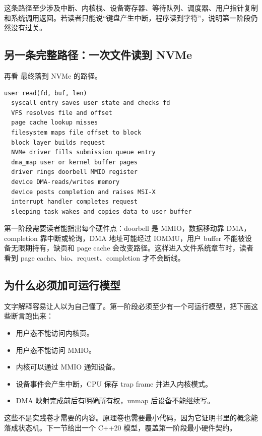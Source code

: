 这条路径至少涉及中断、内核栈、设备寄存器、等待队列、调度器、用户指针复制和系统调用返回。若读者只能说“键盘产生中断，程序读到字符”，说明第一阶段仍然没有过关。

\subsection{另一条完整路径：一次文件读到 NVMe}

再看  最终落到 NVMe 的路径。

\begin{lstlisting}
user read(fd, buf, len)
  syscall entry saves user state and checks fd
  VFS resolves file and offset
  page cache lookup misses
  filesystem maps file offset to block
  block layer builds request
  NVMe driver fills submission queue entry
  dma_map user or kernel buffer pages
  driver rings doorbell MMIO register
  device DMA-reads/writes memory
  device posts completion and raises MSI-X
  interrupt handler completes request
  sleeping task wakes and copies data to user buffer
\end{lstlisting}

第一阶段需要读者能指出每个硬件点：doorbell 是 MMIO，数据移动靠 DMA，completion 靠中断或轮询，DMA 地址可能经过 IOMMU，用户 buffer 不能被设备无限期持有，缺页和 page cache 会改变路径。这样进入文件系统章节时，读者看到 page cache、bio、request、completion 才不会断线。

\subsection{为什么必须加可运行模型}

文字解释容易让人以为自己懂了。第一阶段必须至少有一个可运行模型，把下面这些断言跑出来：

\begin{itemize}
\tightlist
\item 用户态不能访问内核页。
\item 用户态不能访问 MMIO。
\item 内核可以通过 MMIO 通知设备。
\item 设备事件会产生中断，CPU 保存 trap frame 并进入内核模式。
\item DMA 映射完成前后有明确所有权，unmap 后设备不能继续写。
\end{itemize}

这些不是实践卷才需要的内容。原理卷也需要最小代码，因为它证明书里的概念能落成状态机。下一节给出一个 C++20 模型，覆盖第一阶段最小硬件契约。
